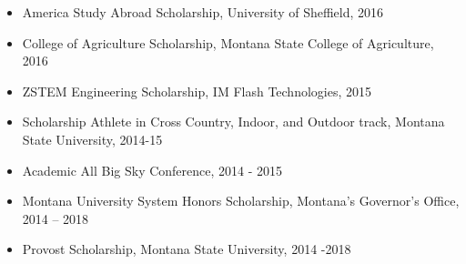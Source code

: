 \documentclass[11pt]{article}
\begin{document}
\begin{itemize}[left=0pt]
    \item America Study Abroad Scholarship, University of Sheffield, 2016
    \item College of Agriculture Scholarship, Montana State College of Agriculture, 2016
    \item ZSTEM Engineering Scholarship, IM Flash Technologies, 2015
    \item Scholarship Athlete in Cross Country, Indoor, and Outdoor track, Montana State University, 2014-15
    \item Academic All Big Sky Conference, 2014 - 2015
    \item Montana University System Honors Scholarship, Montana’s Governor’s Office, 2014 – 2018
    \item Provost Scholarship, Montana State University, 2014 -2018
\end{itemize}
\end{document}
